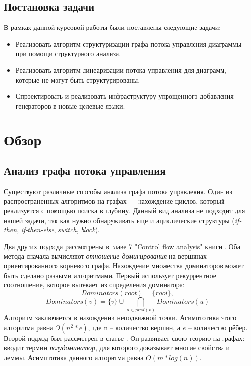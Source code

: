 \documentclass[14pt]{matmex-diploma}
\begin{document}
\subsection*{Постановка задачи}
В рамках данной курсовой работы были поставлены следующие задачи:
\begin{itemize}
    \item Реализовать алгоритм структуризации графа
        потока управления диаграммы
        при помощи структурного анализа.

    \item Реализовать алгоритм линеаризации потока управления для диаграмм,
         которые не могут быть структурированы.
         
    \item Спроектировать и реализовать инфраструктуру упрощенного добавления
        генераторов в новые целевые языки. 
    
\end{itemize}


\section{Обзор}

\subsection{Анализ графа потока управления}

Существуют различные способы анализа графа потока управления.
Один из распространенных алгоритмов на графах --- нахождение циклов, который реализуется
с помощью поиска в глубину. Данный вид анализа не подходит для нашей задачи, 
так как нужно обнаруживать еще и ациклические структуры 
(\emph{if-then}, \emph{if-then-else}, \emph{switch}, \emph{block}).

Два других подхода рассмотрены в главе 7 "Control flow analysis"
книги \cite{muchnick1997advanced}. Оба метода сначала
вычисляют \emph{отношение доминирования}
на вершинах ориентированного корневого графа. Нахождение множества доминаторов
может быть сделано разными алгоритмами. 
Первый использует рекуррентное соотношение, которое вытекает из определения доминатора:
$$ Dominators(root) = \{ root \}, $$
$$ Dominators(v) = \{v\} \cup \bigcap_{u \in pred(v)}Dominators(u)$$
Алгоритм заключается в нахождении неподвижной точки.
Асимптотика этого алгоритма равна $O(n^2*e)$, где n -- количество вершин,
а $e$ -- количество рёбер. Второй подход был рассмотрен в статье \cite{lengauer1979fast}.
Он развивает свою теорию на графах: вводит термин \textit{полудоминатор}, 
для которого доказывает многие свойства и леммы.
Асимптотика данного алгоритма равна $O(m * log(n))$.
\end{document}
